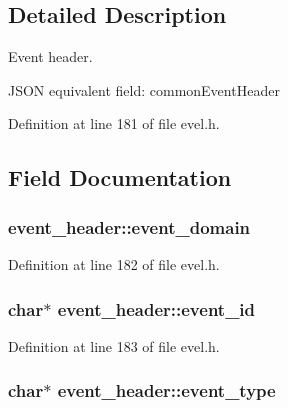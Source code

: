 \subsection{Detailed Description}
Event header. 

J\+S\+O\+N equivalent field\+: common\+Event\+Header 

Definition at line 181 of file evel.\+h.



\subsection{Field Documentation}
\hypertarget{structevent__header_a191eca173d8bd260c598a2b79a026ab1}{}
\subsubsection[{event\+\_\+domain}]{ event\+\_\+header\+::event\+\_\+domain}\label{structevent__header_a191eca173d8bd260c598a2b79a026ab1}


Definition at line 182 of file evel.\+h.

\hypertarget{structevent__header_a8123ea69f23cf078fc39304d6eeb6c26}{}
\subsubsection[{event\+\_\+id}]{\setlength{\rightskip}{0pt plus 5cm}char$\ast$ event\+\_\+header\+::event\+\_\+id}\label{structevent__header_a8123ea69f23cf078fc39304d6eeb6c26}


Definition at line 183 of file evel.\+h.

\hypertarget{structevent__header_a39ed6782a7cfa1bf51d9ba35e92cc803}{}
\subsubsection[{event\+\_\+type}]{\setlength{\rightskip}{0pt plus 5cm}char$\ast$ event\+\_\+header\+::event\+\_\+type}\label{structevent__header_a39ed6782a7cfa1bf51d9ba35e92cc803}


